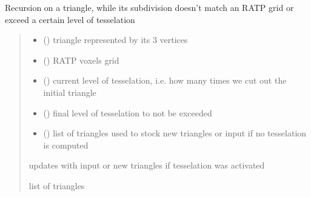 \documentclass[letterpaper,10pt,english]{sphinxmanual}
\begin{document}
\begin{fulllineitems}
\label{\detokenize{reference:tesselator.iterate_trianglesingrid}}
\pysigstartsignatures
{}
\pysigstopsignatures
\sphinxAtStartPar
Recursion on a triangle, while its subdivision doesn’t match an RATP grid or exceed a certain level of tesselation
\begin{quote}\begin{description}
\begin{itemize}
\item {} 
\sphinxAtStartPar
{} () \textendash{} triangle represented by its 3 vertices 

\item {} 
\sphinxAtStartPar
{} () \textendash{} RATP voxels grid

\item {} 
\sphinxAtStartPar
{} () \textendash{} current level of tesselation, i.e. how many times we cut out the initial triangle

\item {} 
\sphinxAtStartPar
{} () \textendash{} final level of tesselation to not be exceeded

\item {} 
\sphinxAtStartPar
{} () \textendash{} list of triangles used to stock new triangles or input  if no tesselation is computed

\end{itemize}

\sphinxAtStartPar
{} updates with input  or new triangles if tesselation was activated

\sphinxAtStartPar
list of triangles

\end{description}\end{quote}

\end{fulllineitems}
\end{document}
